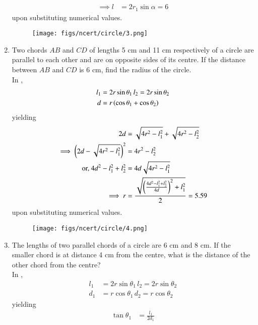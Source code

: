 \begin{enumerate}[label=\thesubsection.\arabic*,ref=\thesubsection.\theenumi]
\begin{align}
	\\
\implies	l &= 2r_1\sin \alpha = 6
\end{align}
upon substituting numerical values.
\begin{figure}[H]
	\begin{center}
		{\texttt{[image: figs/ncert/circle/3.png]}}
	\end{center}
	\caption{}
	\label{fig:ncert-circ-3}	
\end{figure}
%
\item Two chords $AB$ and $CD$ of lengths 5 cm and 11 cm respectively of a circle are parallel
to each other and are on opposite sides of its centre. If the distance between $AB$ and
$CD$ is 6 cm, find the radius of the circle.
	\\
		\solution 
	In , 
\begin{align}
	l_1&=2r \sin \theta_1\,
	l_2=2r \sin \theta_2
	\\
	d &= r \left(\cos \theta_1+\cos \theta_2\right)
\end{align}
yielding
\begin{align}
	2d &=  \sqrt{4r^2-l_1^2}+\sqrt{4r^2-l_2^2}
	\\
	\implies 
	\left(2d -  \sqrt{4r^2-l_1^2}\right)^2&=4r^2-l_2^2
	\\
	\text{or, }4d^2 -l_1^2+l_2^2&=4d\sqrt{4r^2-l_1^2}
	\\
	\implies r &= \frac{\sqrt{\left(\frac{4d^2 -l_1^2+l_2^2}{4d}\right)^2+l_1^2}}{2} = 5.59 
\end{align}
upon substituting numerical values.
\begin{figure}[H]
	\begin{center}
		{\texttt{[image: figs/ncert/circle/4.png]}}
	\end{center}
	\caption{}
	\label{fig:ncert-circ-4}	
\end{figure}
%
\item The lengths of two parallel chords of a circle are 6 cm and 8 cm. If the smaller chord is
at distance 4 cm from the centre, what is the distance of the other chord from the
centre?
\\
\solution
	In , 
\begin{align}
	l_1&=2r \sin \theta_1\,
	l_2=2r \sin \theta_2
	\\
	d_1 &= r \cos \theta_1\,
	d_2 =r\cos \theta_2
\end{align}
yielding
\begin{align}
	\tan \theta_1 &= \frac{l_1}{2d_1}	
	\\

\end{align}
\end{enumerate}
